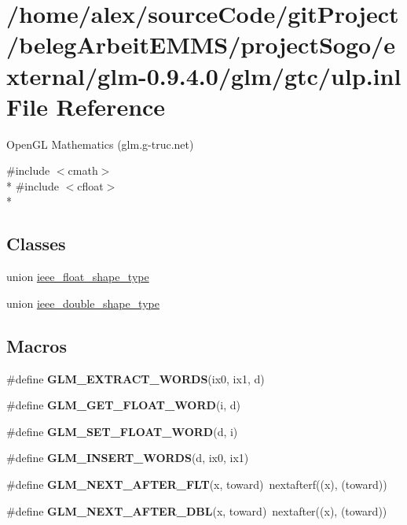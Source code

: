 \hypertarget{ulp_8inl}{\section{/home/alex/source\-Code/git\-Project/beleg\-Arbeit\-E\-M\-M\-S/project\-Sogo/external/glm-\/0.9.4.0/glm/gtc/ulp.inl File Reference}
\label{ulp_8inl}
}


Open\-G\-L Mathematics (glm.\-g-\/truc.\-net)  


{\ttfamily \#include $<$cmath$>$}\\*
{\ttfamily \#include $<$cfloat$>$}\\*
\subsection*{Classes}
\begin{DoxyCompactItemize}
\item 
union \hyperlink{unionieee__float__shape__type}{ieee\-\_\-float\-\_\-shape\-\_\-type}
\item 
union \hyperlink{unionieee__double__shape__type}{ieee\-\_\-double\-\_\-shape\-\_\-type}
\end{DoxyCompactItemize}
\subsection*{Macros}
\begin{DoxyCompactItemize}
\item 
\#define {\bfseries G\-L\-M\-\_\-\-E\-X\-T\-R\-A\-C\-T\-\_\-\-W\-O\-R\-D\-S}(ix0, ix1, d)
\item 
\#define {\bfseries G\-L\-M\-\_\-\-G\-E\-T\-\_\-\-F\-L\-O\-A\-T\-\_\-\-W\-O\-R\-D}(i, d)
\item 
\#define {\bfseries G\-L\-M\-\_\-\-S\-E\-T\-\_\-\-F\-L\-O\-A\-T\-\_\-\-W\-O\-R\-D}(d, i)
\item 
\#define {\bfseries G\-L\-M\-\_\-\-I\-N\-S\-E\-R\-T\-\_\-\-W\-O\-R\-D\-S}(d, ix0, ix1)
\item 
\hypertarget{ulp_8inl_a37306c8581ba58873df0e36d3a253cec}{\#define {\bfseries G\-L\-M\-\_\-\-N\-E\-X\-T\-\_\-\-A\-F\-T\-E\-R\-\_\-\-F\-L\-T}(x, toward)~nextafterf((x), (toward))}\label{ulp_8inl_a37306c8581ba58873df0e36d3a253cec}

\item 
\hypertarget{ulp_8inl_a4f17b207ed3eb0c72bdeffb6eb013e90}{\#define {\bfseries G\-L\-M\-\_\-\-N\-E\-X\-T\-\_\-\-A\-F\-T\-E\-R\-\_\-\-D\-B\-L}(x, toward)~nextafter((x), (toward))}\label{ulp_8inl_a4f17b207ed3eb0c72bdeffb6eb013e90}

\end{DoxyCompactItemize}
